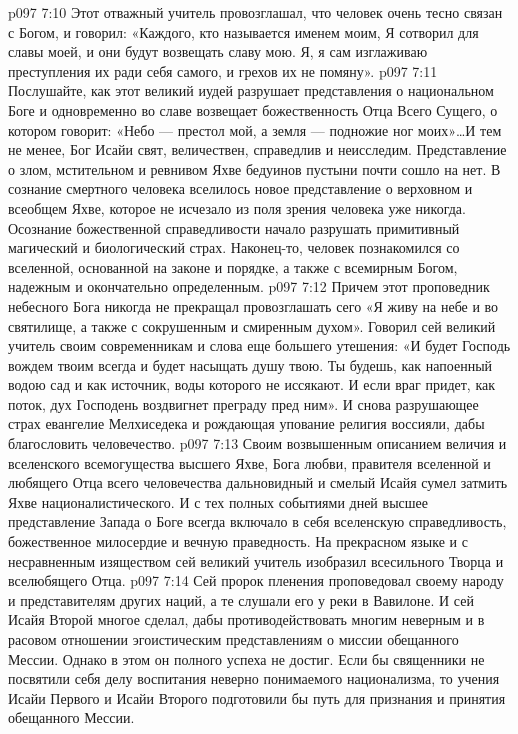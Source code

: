\vs p097 7:10 Этот отважный учитель провозглашал, что человек очень тесно связан с Богом, и говорил: «Каждого, кто называется именем моим, Я сотворил для славы моей, и они будут возвещать славу мою. Я, я сам изглаживаю преступления их ради себя самого, и грехов их не помяну».
\vs p097 7:11 Послушайте, как этот великий иудей разрушает представления о национальном Боге и одновременно во славе возвещает божественность Отца Всего Сущего, о котором говорит: «Небо --- престол мой, а земля --- подножие ног моих»\ldots И тем не менее, Бог Исайи свят, величествен, справедлив и неисследим. Представление о злом, мстительном и ревнивом Яхве бедуинов пустыни почти сошло на нет. В сознание смертного человека вселилось новое представление о верховном и всеобщем Яхве, которое не исчезало из поля зрения человека уже никогда. Осознание божественной справедливости начало разрушать примитивный магический и биологический страх. Наконец\hyp{}то, человек познакомился со вселенной, основанной на законе и порядке, а также с всемирным Богом, надежным и окончательно определенным.
\vs p097 7:12 Причем этот проповедник небесного Бога никогда не прекращал провозглашать сего  «Я живу на небе и во святилище, а также с сокрушенным и смиренным духом». Говорил сей великий учитель своим современникам и слова еще большего утешения: «И будет Господь вождем твоим всегда и будет насыщать душу твою. Ты будешь, как напоенный водою сад и как источник, воды которого не иссякают. И если враг придет, как поток, дух Господень воздвигнет преграду пред ним». И снова разрушающее страх евангелие Мелхиседека и рождающая упование религия воссияли, дабы благословить человечество.
\vs p097 7:13 Своим возвышенным описанием величия и вселенского всемогущества высшего Яхве, Бога любви, правителя вселенной и любящего Отца всего человечества дальновидный и смелый Исайя сумел затмить Яхве националистического. И с тех полных событиями дней высшее представление Запада о Боге всегда включало в себя вселенскую справедливость, божественное милосердие и вечную праведность. На прекрасном языке и с несравненным изяществом сей великий учитель изобразил всесильного Творца и вселюбящего Отца.
\vs p097 7:14 Сей пророк пленения проповедовал своему народу и представителям других наций, а те слушали его у реки в Вавилоне. И сей Исайя Второй многое сделал, дабы противодействовать многим неверным и в расовом отношении эгоистическим представлениям о миссии обещанного Мессии. Однако в этом он полного успеха не достиг. Если бы священники не посвятили себя делу воспитания неверно понимаемого национализма, то учения Исайи Первого и Исайи Второго подготовили бы путь для признания и принятия обещанного Мессии.
